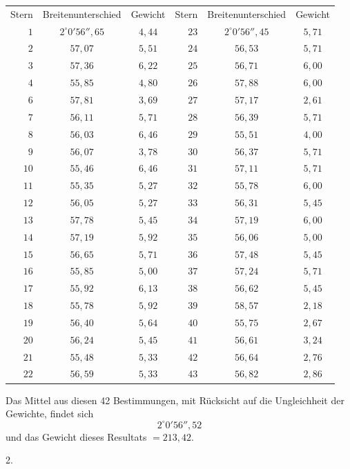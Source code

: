 \begin{center}
{\small\setlength{\tabcolsep}{7pt}\renewcommand{\arraystretch}{1.05}
\begin{tabular}{r|c|c||r|c|c}
Stern& Breitenunterschied& Gewicht& Stern& Breitenunterschied& Gewicht\\
\cline{1-3}\cline{4-6}
$1$&$2^\circ0'56''{,}65$&$4{,}44$&$23$&$2^\circ0'56''{,}45$&$5{,}71$\\
$2$&$57{,}07$&$5{,}51$&$24$&$56{,}53$&$5{,}71$\\
$3$&$57{,}36$&$6{,}22$&$25$&$56{,}71$&$6{,}00$\\
$4$&$55{,}85$&$4{,}80$&$26$&$57{,}88$&$6{,}00$\\
$6$&$57{,}81$&$3{,}69$&$27$&$57{,}17$&$2{,}61$\\
$7$&$56{,}11$&$5{,}71$&$28$&$56{,}39$&$5{,}71$\\
$8$&$56{,}03$&$6{,}46$&$29$&$55{,}51$&$4{,}00$\\
$9$&$56{,}07$&$3{,}78$&$30$&$56{,}37$&$5{,}71$\\
$10$&$55{,}46$&$6{,}46$&$31$&$57{,}11$&$5{,}71$\\
$11$&$55{,}35$&$5{,}27$&$32$&$55{,}78$&$6{,}00$\\
$12$&$56{,}05$&$5{,}27$&$33$&$56{,}31$&$5{,}45$\\
$13$&$57{,}78$&$5{,}45$&$34$&$57{,}19$&$6{,}00$\\
$14$&$57{,}19$&$5{,}92$&$35$&$56{,}06$&$5{,}00$\\
$15$&$56{,}65$&$5{,}71$&$36$&$57{,}48$&$5{,}45$\\
$16$&$55{,}85$&$5{,}00$&$37$&$57{,}24$&$5{,}71$\\
$17$&$55{,}92$&$6{,}13$&$38$&$56{,}62$&$5{,}45$\\
$18$&$55{,}78$&$5{,}92$&$39$&$58{,}57$&$2{,}18$\\
$19$&$56{,}40$&$5{,}64$&$40$&$55{,}75$&$2{,}67$\\
$20$&$56{,}24$&$5{,}45$&$41$&$56{,}61$&$3{,}24$\\
$21$&$55{,}48$&$5{,}33$&$42$&$56{,}64$&$2{,}76$\\
$22$&$56{,}59$&$5{,}33$&$43$&$56{,}82$&$2{,}86$\\
\end{tabular}}
\end{center}

Das Mittel aus diesen 42 Bestimmungen, mit Rücksicht auf die Ungleichheit
der Gewichte, findet sich
\[
2^\circ0'56''{,}52
\]
und das Gewicht dieses Resultats $=213{,}42$.

\begin{center}2.\end{center}

